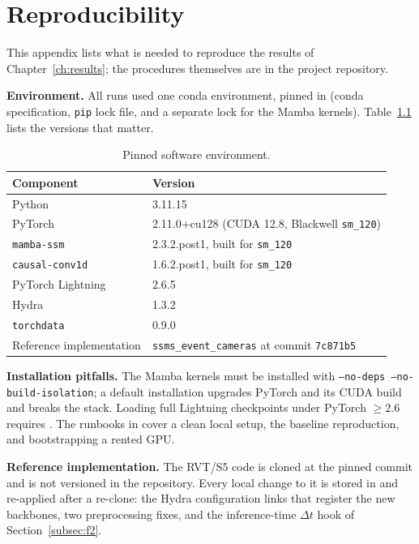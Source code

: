 \documentclass[11pt, a4paper]{report}
\begin{document}

\chapter{Reproducibility}
\label{app:repro}
This appendix lists what is needed to reproduce the results of Chapter~\ref{ch:results}; the procedures
themselves are in the project repository.

\textbf{Environment.} All runs used one conda environment, pinned in  (conda specification,
\texttt{pip} lock file, and a separate lock for the Mamba kernels). Table~\ref{tab:env} lists the
versions that matter.

\begin{table}[htbp]
\centering
\small
\caption{Pinned software environment.}
\label{tab:env}
\begin{tabular}{ll}
\toprule
Component & Version \\
\midrule
Python & 3.11.15 \\
PyTorch & 2.11.0+cu128 (CUDA 12.8, Blackwell \texttt{sm\_120}) \\
\texttt{mamba-ssm} & 2.3.2.post1, built for \texttt{sm\_120} \\
\texttt{causal-conv1d} & 1.6.2.post1, built for \texttt{sm\_120} \\
PyTorch Lightning & 2.6.5 \\
Hydra & 1.3.2 \\
\texttt{torchdata} & 0.9.0 \\
Reference implementation & \texttt{ssms\_event\_cameras} at commit \texttt{7c871b5} \\
\bottomrule
\end{tabular}
\end{table}

{\sloppy \textbf{Installation pitfalls.} The Mamba kernels must be installed with \texttt{--no-deps
--no-build-isolation}; a default installation upgrades PyTorch and its CUDA build and breaks the stack.
Loading full Lightning checkpoints under PyTorch $\geq 2.6$ requires
. The runbooks in  cover a clean
local setup, the baseline reproduction, and bootstrapping a rented GPU.\par}

\textbf{Reference implementation.} The RVT/S5 code is cloned at the pinned commit and is not versioned in the
repository. Every local change to it is stored in  and re-applied after a re-clone: the
Hydra configuration links that register the new backbones, two preprocessing fixes, and the inference-time
$\Delta t$ hook of Section~\ref{subsec:f2}.
\end{document}
